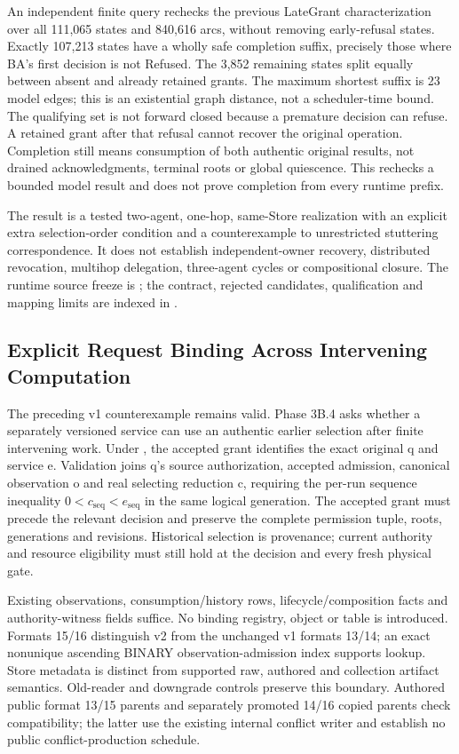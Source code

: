 \documentclass[11pt,a4paper]{article}
\theoremstyle{definition}
\theoremstyle{remark}
\begin{document}
An independent finite query rechecks the previous LateGrant characterization over all 111,065 states and 840,616 arcs, without removing early-refusal states. Exactly 107,213 states have a wholly safe completion suffix, precisely those where BA's first decision is not Refused. The 3,852 remaining states split equally between absent and already retained grants. The maximum shortest suffix is 23 model edges; this is an existential graph distance, not a scheduler-time bound. The qualifying set is not forward closed because a premature decision can refuse. A retained grant after that refusal cannot recover the original operation. Completion still means consumption of both authentic original results, not drained acknowledgments, terminal roots or global quiescence. This rechecks a bounded model result and does not prove completion from every runtime prefix.

The result is a tested two-agent, one-hop, same-Store realization with an explicit extra selection-order condition and a counterexample to unrestricted stuttering correspondence. It does not establish independent-owner recovery, distributed revocation, multihop delegation, three-agent cycles or compositional closure. The runtime source freeze is ; the contract, rejected candidates, qualification and mapping limits are indexed in .

\subsection{Explicit Request Binding Across Intervening Computation}

The preceding v1 counterexample remains valid. Phase 3B.4 asks whether a separately versioned service can use an authentic earlier selection after finite intervening work. Under , the accepted grant identifies the exact original q and service e. Validation joins q's source authorization, accepted admission, canonical observation o and real selecting reduction c, requiring the per-run sequence inequality $0<c_{\mathrm{seq}}<e_{\mathrm{seq}}$ in the same logical generation. The accepted grant must precede the relevant decision and preserve the complete permission tuple, roots, generations and revisions. Historical selection is provenance; current authority and resource eligibility must still hold at the decision and every fresh physical gate.

Existing observations, consumption/history rows, lifecycle/composition facts and authority-witness fields suffice. No binding registry, object or table is introduced. Formats 15/16 distinguish v2 from the unchanged v1 formats 13/14; an exact nonunique ascending BINARY observation-admission index supports lookup. Store metadata  is distinct from supported raw, authored and collection artifact semantics. Old-reader and downgrade controls preserve this boundary. Authored public format 13/15 parents and separately promoted 14/16 copied parents check compatibility; the latter use the existing internal conflict writer and establish no public conflict-production schedule.
\end{document}

